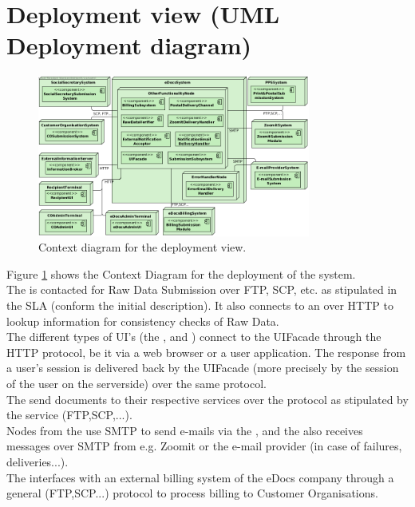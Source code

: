 \section{Deployment view (UML Deployment diagram)}\label{sec:deployment}

\begin{figure}
    \centering
    \includegraphics[width=0.8\textwidth]{figures/Deployment Context.png}
    \caption{Context diagram for the deployment view.}\label{fig:depl_context}
\end{figure}

Figure \ref{fig:depl_context} shows the Context Diagram for the deployment of the system.\\
The  is contacted for Raw Data Submission over FTP, SCP, etc. as stipulated in the SLA (conform the initial description). It also connects to an  over HTTP to lookup information for consistency checks of Raw Data.\\
The different types of UI's (the ,  and ) connect to the UIFacade through the HTTP protocol, be it via a web browser or a user application. The response from a user's session is delivered back by the UIFacade (more precisely by the session of the user on the serverside) over the same protocol.\\
The  send documents to their respective services over the protocol as stipulated by the service (FTP,SCP,...).\\
Nodes from the  use SMTP to send e-mails via the , and the  also receives messages over SMTP from e.g. Zoomit or the e-mail provider (in case of failures, deliveries...).\\
The  interfaces with an external billing system of the eDocs company through a general (FTP,SCP...) protocol to process billing to Customer Organisations.

